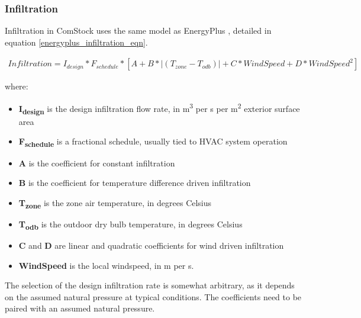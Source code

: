 \subsubsection{Infiltration}
Infiltration in ComStock uses the same model as EnergyPlus \citep{energy_plus}, detailed in equation \ref{energyplus_infiltration_eqn}.

\begin{align}
\label{energyplus_infiltration_eqn}
Infiltration = I_{design} * F_{schedule} * [A + B * |(T_{zone} - T_{odb})| + C * WindSpeed + D * WindSpeed^2]
\end{align}

where:\\
\begin{itemize}
\item \textbf{I\textsubscript{design}} is the design infiltration flow rate, in m\textsuperscript{3} per s per m\textsuperscript{2} exterior surface area\\
\item \textbf{F\textsubscript{schedule}} is a fractional schedule, usually tied to HVAC system operation\\
\item \textbf{A} is the coefficient for constant infiltration\\
\item \textbf{B} is the coefficient for temperature difference driven infiltration\\
\item \textbf{T\textsubscript{zone}} is the zone air temperature, in degrees Celsius\\
\item \textbf{T\textsubscript{odb}}  is the outdoor dry bulb temperature, in degrees Celsius\\
\item \textbf{C} and \textbf{D} are linear and quadratic coefficients for wind driven infiltration\\
\item \textbf{WindSpeed} is the local windspeed, in m per s.\\
\end{itemize}

The selection of the design infiltration rate is somewhat arbitrary, as it depends on the assumed natural pressure at typical conditions. The coefficients need to be paired with an assumed natural pressure.

